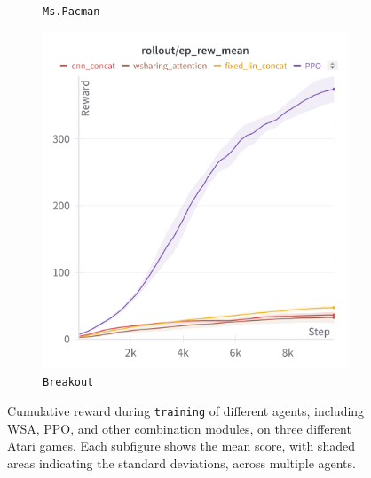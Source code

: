 \begin{figure}[ht]
\begin{subfigure}[b]{0.32\textwidth}
        \caption{\texttt{Ms.Pacman}}
        \label{fig:mspacmantrain}
    \end{subfigure}
    \hfill
    \begin{subfigure}[b]{0.32\textwidth}
        \centering
        \includegraphics[width=\textwidth]{images/breakout_train.png}
        \caption{\texttt{Breakout}}
        \label{fig:breakouttrain}
    \end{subfigure}
    \caption{Cumulative reward during \texttt{training} of different agents, including WSA, PPO, and other combination modules, on three different Atari games. Each subfigure shows the mean score, with shaded areas indicating the standard deviations, across multiple agents.}
    \label{fig:trainresults}
\end{figure}


